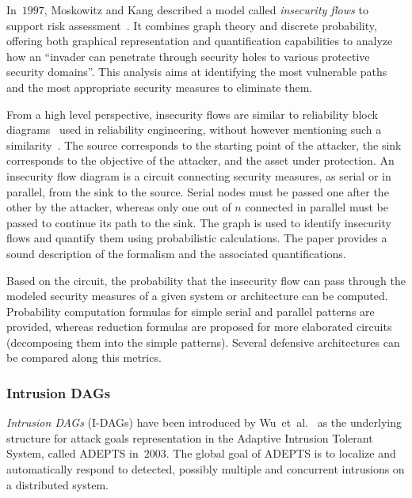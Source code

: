 \documentclass[a4paper]{article}
\begin{document}
In~$1997$, Moskowitz and Kang described a model called \emph{insecurity flows}
to support risk assessment~\cite{MoKa}. It combines graph theory and discrete
probability, offering both graphical representation and quantification
capabilities to analyze how an ``invader can penetrate through security holes
to various protective security domains''. This analysis aims at identifying the
most vulnerable paths and the most appropriate security measures to eliminate
them.

From a high level perspective, insecurity flows are similar to reliability
block diagrams~\cite{Elec} used in reliability engineering, without however
mentioning such a similarity~\cite{MoKa}. The source corresponds to the
starting point of the attacker, the sink corresponds to the objective of the
attacker, and the asset under protection. An insecurity flow diagram is a
circuit connecting security measures, as serial or in parallel,
from the sink to the source. Serial nodes must be passed one after
the other by the attacker, whereas only one out of $n$ connected
in parallel must be passed to continue its path to the sink.
The graph is used to identify insecurity flows and quantify them
using probabilistic calculations. The paper provides a sound description of
the formalism and the associated quantifications.

Based on the circuit, the probability that the insecurity flow can pass
through the modeled security measures of a given system or architecture can be
computed. Probability computation formulas for simple serial and parallel
patterns are provided, whereas reduction formulas are proposed for more
elaborated circuits (decomposing them into the simple patterns).
Several defensive architectures can be compared along this metrics.

\subsubsection{Intrusion DAGs} 
\label{sec:i-dag}

\emph{Intrusion DAGs} (I-DAGs) have been introduced by 
Wu~et~al.~\cite{BagchiTech} as the underlying structure  for attack goals
representation in the Adaptive Intrusion Tolerant System, called ADEPTS
in~$2003$. The global goal of ADEPTS is to localize and automatically respond to
detected, possibly multiple and concurrent intrusions  on a distributed system. 
\end{document}
